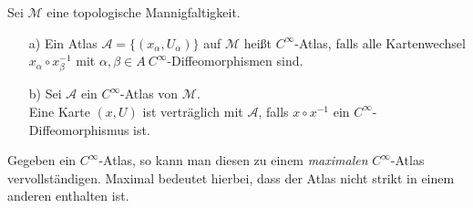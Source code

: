 \begin{defs}
Sei $ \mathcal{M}$ eine topologische Mannigfaltigkeit.
\begin{enumerate}
	\item[a)] Ein Atlas $\mathcal{A} = \{(x_{\alpha},U_{\alpha})\}$ auf $\mathcal{M}$ heißt $C^{\infty}$-Atlas, falls alle Kartenwechsel $x_{\alpha}\circ x_{\beta}^{-1}$ mit $\alpha, \beta \in A \ C^{\infty}$-Diffeomorphismen sind.
	\item[b)] Sei $\mathcal{A}$ ein $C^{\infty}$-Atlas von $\mathcal{M}$. \\
	Eine Karte $(x,U)$ ist verträglich mit $\mathcal{A}$, falls $x \circ x^{-1}$ ein $C^{\infty}$-Diffeomorphismus ist.
\end{enumerate}
\end{defs}
Gegeben ein $C^{\infty}$-Atlas, so kann man diesen zu einem \textit{maximalen} $C^{\infty}$-Atlas vervollständigen. Maximal bedeutet hierbei, dass der Atlas nicht strikt in einem anderen enthalten ist.

